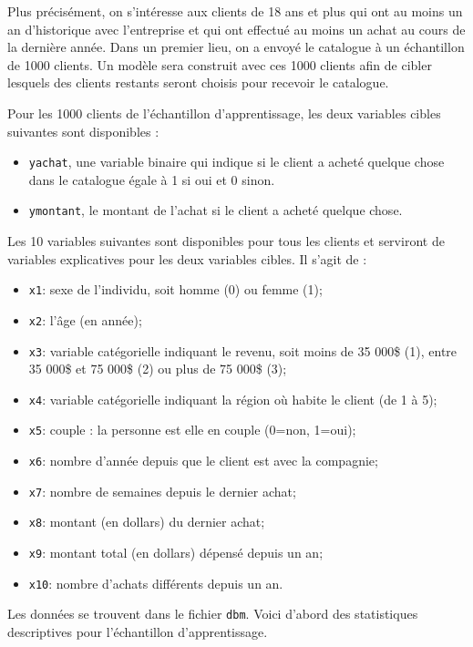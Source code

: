 \documentclass[
  11pt,
  letterpaper,
]{book}
\providecommand{\tightlist}{%
  \setlength{\itemsep}{0pt}\setlength{\parskip}{0pt}}\usepackage{longtable,booktabs,array}
\theoremstyle{definition}
\theoremstyle{remark}
\begin{document}
Plus précisément, on s'intéresse aux clients de 18 ans et plus qui ont
au moins un an d'historique avec l'entreprise et qui ont effectué au
moins un achat au cours de la dernière année. Dans un premier lieu, on a
envoyé le catalogue à un échantillon de 1000 clients. Un modèle sera
construit avec ces 1000 clients afin de cibler lesquels des clients
restants seront choisis pour recevoir le catalogue.

Pour les 1000 clients de l'échantillon d'apprentissage, les deux
variables cibles suivantes sont disponibles :

\begin{itemize}
\tightlist
\item
  \texttt{yachat}, une variable binaire qui indique si le client a
  acheté quelque chose dans le catalogue égale à 1 si oui et 0 sinon.
\item
  \texttt{ymontant}, le montant de l'achat si le client a acheté quelque
  chose.
\end{itemize}

Les 10 variables suivantes sont disponibles pour tous les clients et
serviront de variables explicatives pour les deux variables cibles. Il
s'agit de :

\begin{itemize}
\tightlist
\item
  \texttt{x1}: sexe de l'individu, soit homme (0) ou femme (1);
\item
  \texttt{x2}: l'âge (en année);
\item
  \texttt{x3}: variable catégorielle indiquant le revenu, soit moins de
  35 000\$ (1), entre 35 000\$ et 75 000\$ (2) ou plus de 75 000\$ (3);
\item
  \texttt{x4}: variable catégorielle indiquant la région où habite le
  client (de 1 à 5);
\item
  \texttt{x5}: couple : la personne est elle en couple (0=non, 1=oui);
\item
  \texttt{x6}: nombre d'année depuis que le client est avec la
  compagnie;
\item
  \texttt{x7}: nombre de semaines depuis le dernier achat;
\item
  \texttt{x8}: montant (en dollars) du dernier achat;
\item
  \texttt{x9}: montant total (en dollars) dépensé depuis un an;
\item
  \texttt{x10}: nombre d'achats différents depuis un an.
\end{itemize}

Les données se trouvent dans le fichier \texttt{dbm}. Voici d'abord des
statistiques descriptives pour l'échantillon d'apprentissage.
\end{document}
